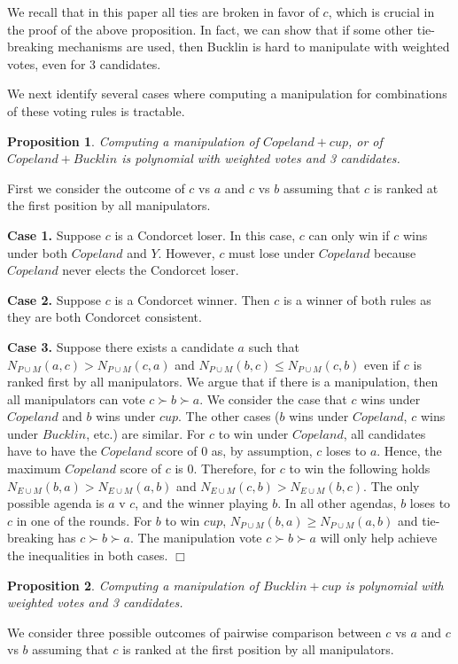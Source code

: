 \documentclass{ecai2012}
\newcommand{\winner}[2]{\mbox{$#1 + #2$}}
\newtheorem{proposition}{Proposition}
\newcommand{\myproof}{\vspace{-3mm}\noindent {\bf Proof:\ \ }}
\newcommand{\myqed}{\mbox{$\Box$}}
\newcommand\lirong[1]{}
\begin{document}
We recall that in this paper all ties are broken in favor of $c$, which is crucial in the proof of the above proposition. In fact, we can show that if some other tie-breaking mechanisms are used, then Bucklin is hard to manipulate with weighted votes, even for $3$ candidates. \lirong{I added this clarification.}


We next identify several cases where computing
a manipulation for combinations of
these voting rules is tractable.

\begin{proposition}
Computing a manipulation of $\winner{Copeland}{cup}$,
or of $\winner{Copeland}{Bucklin}$
is polynomial with
weighted votes and 3 candidates.
\end{proposition}
\myproof
First we consider the outcome of
$c$ vs $a$ and $c$ vs $b$
assuming that $c$ is ranked at the first position
by all manipulators.

{\bf Case 1.} Suppose $c$ is a Condorcet loser.
In this case, $c$ can only win
if $c$ wins under both $Copeland$ and $Y$.
However, $c$ must lose under $Copeland$ because
$Copeland$ never elects the Condorcet loser.

{\bf Case 2.}
Suppose $c$ is a Condorcet winner.
Then $c$ is a winner of both rules as they are
both Condorcet consistent.

{\bf Case 3.} Suppose there exists a candidate $a$ such that
$N_{P \cup M}(a,c) > N_{P \cup M}(c,a)$ and
$N_{P \cup M}(b,c) \leq N_{P \cup M}(c,b)$
even if $c$ is ranked first by all manipulators.
We argue that if there is a manipulation,
then all manipulators can vote $c \succ b \succ a$. We
consider the case that $c$ wins under $Copeland$
and $b$ wins under $cup$. The other cases ($b$ wins
under $Copeland$, $c$ wins under $Bucklin$, etc.) are
similar.
For $c$ to win under $Copeland$,
all candidates
have to have the $Copeland$ score of 0 as, by assumption,
$c$ loses to $a$. Hence, the maximum $Copeland$
score of $c$ is $0$. Therefore,
for $c$ to win  the following holds
$N_{E \cup M}(b,a) > N_{E \cup M}(a,b)$
and $N_{E \cup M}(c,b) > N_{E \cup M}(b,c)$.
The only possible agenda is $a$ v $c$, and the winner
playing $b$. In all other agendas, $b$ loses to $c$
in one of the rounds. For $b$ to win $cup$,
$N_{P \cup M}(b,a) \geq N_{P \cup M}(a,b)$ and tie-breaking
has $c \succ b \succ a$.
The manipulation vote $c \succ b \succ a$ will only help achieve
the inequalities in both cases.
\myqed

\begin{proposition}
Computing a manipulation of $\winner{Bucklin}{cup}$
is polynomial with weighted votes and 3 candidates.
\end{proposition}
\myproof
We consider three possible outcomes of pairwise
comparison between $c$ vs $a$ and $c$ vs $b$
assuming that $c$ is ranked at the first position
by all manipulators.
\end{document}
